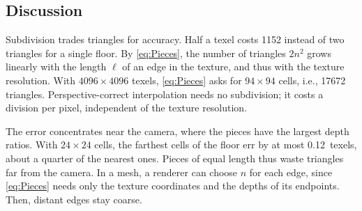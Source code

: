 \begin{table}[t]
    \centering
    
    \caption{
        We split the floor of \cref{fig:Teaser} into $n\times n$ cells of two triangles each.
        Predicted is \cref{eq:MaxError} for the diagonal of a cell next to the camera, bound is \cref{eq:SubdivisionBound}.
        Bold marks errors below half a texel.
    }
    \label{tab:Subdivision}
\end{table}

\subsection{Discussion}\label{sec:Discussion}
Subdivision trades triangles for accuracy.
Half a texel costs \num{1152} instead of two triangles for a single floor.
By \cref{eq:Pieces}, the number of triangles $2n^2$ grows linearly with the length $\ell$ of an edge in the texture, and thus with the texture resolution.
With $4096\times4096$ texels, \cref{eq:Pieces} asks for $94\times94$ cells, i.e., \num{17672} triangles.
Perspective-correct interpolation needs no subdivision; it costs a division per pixel, independent of the texture resolution.

The error concentrates near the camera, where the pieces have the largest depth ratios.
With $24\times24$ cells, the farthest cells of the floor err by at most 0.12~texels, about a quarter of the nearest ones.
Pieces of equal length thus waste triangles far from the camera.
In a mesh, a renderer can choose $n$ for each edge, since \cref{eq:Pieces} needs only the texture coordinates and the depths of its endpoints.
Then, distant edges stay coarse.
